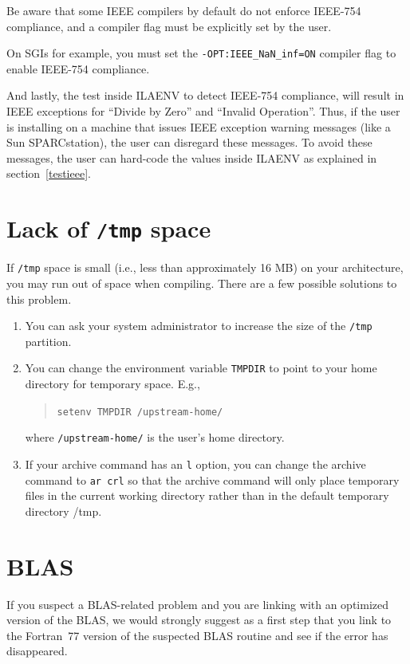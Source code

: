 \documentclass[11pt]{report}
\begin{document}
Be aware
that some IEEE compilers by default do not enforce IEEE-754 compliance, and
a compiler flag must be explicitly set by the user.

On SGIs for example, you must set the \texttt{-OPT:IEEE\_NaN\_inf=ON} compiler
flag to enable IEEE-754 compliance.

And lastly, the test inside ILAENV to detect IEEE-754 compliance, will
result in IEEE exceptions for ``Divide by Zero'' and ``Invalid Operation''.
Thus, if the user is installing on a machine that issues IEEE exception
warning messages (like a Sun SPARCstation), the user can disregard these
messages.  To avoid these messages, the user can hard-code the values
inside ILAENV as explained in section~\ref{testieee}.

\section{Lack of \texttt{/tmp} space}

If \texttt{/tmp} space is small (i.e., less than approximately 16 MB) on your
architecture, you may run out of space
when compiling.  There are a few possible solutions to this problem.
\begin{enumerate}
\item You can ask your system administrator to increase the size of the
\texttt{/tmp} partition.
\item You can change the environment variable \texttt{TMPDIR} to point to
your home directory for temporary space.  E.g.,
\begin{quote}
\texttt{setenv TMPDIR /upstream-home/}
\end{quote}
where \texttt{/upstream-home/} is the user's home directory.
\item If your archive command has an \texttt{l} option, you can change the
archive command to \texttt{ar crl} so that the
archive command will only place temporary files in the current working
directory rather than in the default temporary directory /tmp.
\end{enumerate}

\section{BLAS}

If you suspect a BLAS-related problem and you are linking
with an optimized version of the BLAS, we would strongly suggest
as a first step that you link to the Fortran~77 version of
the suspected BLAS routine and see if the error has disappeared.
\end{document}
